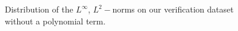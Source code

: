 \documentclass[12pt]{report} %
\begin{document}
\begin{figure}
\begin{tabular}{cccccc}
  \end{tabular}
  \caption{Distribution of the $L^\infty$, $L^2-$norms on our verification dataset
    without a polynomial term.}
  \label{fig:parabola-results-overall-poly-1}
\end{figure}
\end{document}
